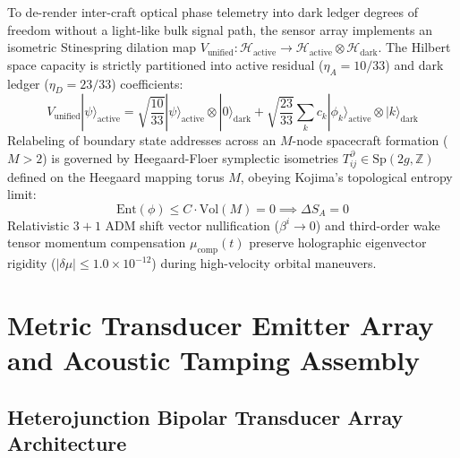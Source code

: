 \documentclass[10pt,twocolumn]{IEEEtran}
\begin{document}
To de-render inter-craft optical phase telemetry into dark ledger degrees of freedom without a light-like bulk signal path, the sensor array implements an isometric Stinespring dilation map $V_{\text{unified}} : \mathcal{H}_{\text{active}} \to \mathcal{H}_{\text{active}} \otimes \mathcal{H}_{\text{dark}}$. The Hilbert space capacity is strictly partitioned into active residual ($\eta_A = 10/33$) and dark ledger ($\eta_D = 23/33$) coefficients:
\begin{equation}
    V_{\text{unified}} |\psi\rangle_{\text{active}} = \sqrt{\frac{10}{33}} |\psi\rangle_{\text{active}} \otimes |0\rangle_{\text{dark}} + \sqrt{\frac{23}{33}} \sum_{k} c_k |\phi_k\rangle_{\text{active}} \otimes |k\rangle_{\text{dark}}
\end{equation}
Relabeling of boundary state addresses across an $M$-node spacecraft formation ($M > 2$) is governed by Heegaard-Floer symplectic isometries $T^\partial_{ij} \in \text{Sp}(2g, \mathbb{Z})$ defined on the Heegaard mapping torus $M$, obeying Kojima's topological entropy limit:
\begin{equation}
    \text{Ent}(\phi) \le C \cdot \text{Vol}(M) = 0 \implies \Delta S_A = 0
\end{equation}
Relativistic $3+1$ ADM shift vector nullification ($\beta^i \to 0$) and third-order wake tensor momentum compensation $\mu_{\text{comp}}(t)$ preserve holographic eigenvector rigidity ($\vert{}\delta\mu\vert{} \le 1.0 \times 10^{-12}$) during high-velocity orbital maneuvers.

\section{Metric Transducer Emitter Array and Acoustic Tamping Assembly}
\label{sec:transducer_tamping}

\subsection{Heterojunction Bipolar Transducer Array Architecture}
\end{document}
